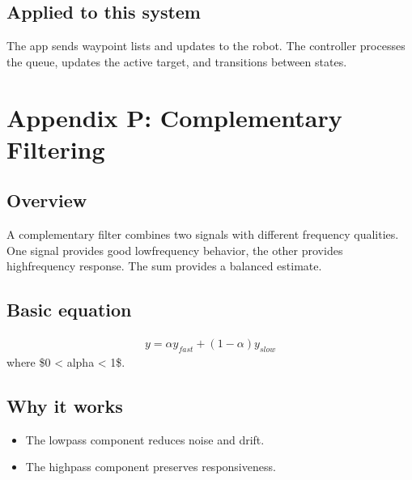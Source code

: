 \documentclass[letterpaper,10pt,english]{sphinxmanual}
\begin{document}
\section{Applied to this system}
\label{\detokenize{appendix_o_waypoint_navigation:applied-to-this-system}}
\sphinxAtStartPar
The app sends waypoint lists and updates to the robot. The controller processes
the queue, updates the active target, and transitions between states.


\chapter{Appendix P: Complementary Filtering}
\label{\detokenize{appendix_p_complementary_filtering:appendix-p-complementary-filtering}}\label{\detokenize{appendix_p_complementary_filtering::doc}}

\section{Overview}
\label{\detokenize{appendix_p_complementary_filtering:overview}}
\sphinxAtStartPar
A complementary filter combines two signals with different frequency qualities.
One signal provides good low\sphinxhyphen{}frequency behavior, the other provides high\sphinxhyphen{}frequency
response. The sum provides a balanced estimate.


\section{Basic equation}
\label{\detokenize{appendix_p_complementary_filtering:basic-equation}}\begin{equation*}
\begin{split}y = \alpha y_{fast} + (1 - \alpha) y_{slow}\end{split}
\end{equation*}
\sphinxAtStartPar
where \$0 \textless{} alpha \textless{} 1\$.


\section{Why it works}
\label{\detokenize{appendix_p_complementary_filtering:why-it-works}}\begin{itemize}
\item {} 
\sphinxAtStartPar
The low\sphinxhyphen{}pass component reduces noise and drift.

\item {} 
\sphinxAtStartPar
The high\sphinxhyphen{}pass component preserves responsiveness.

\end{itemize}
\end{document}
